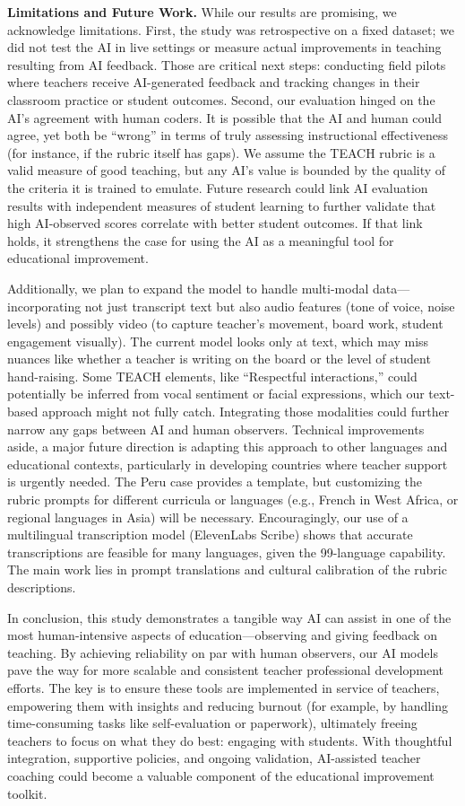 \documentclass[12pt]{article}
\begin{document}
\textbf{Limitations and Future Work.} While our results are promising, we acknowledge limitations. First, the study was retrospective on a fixed dataset; we did not test the AI in live settings or measure actual improvements in teaching resulting from AI feedback. Those are critical next steps: conducting field pilots where teachers receive AI-generated feedback and tracking changes in their classroom practice or student outcomes. Second, our evaluation hinged on the AI’s agreement with human coders. It is possible that the AI and human could agree, yet both be “wrong” in terms of truly assessing instructional effectiveness (for instance, if the rubric itself has gaps). We assume the TEACH rubric is a valid measure of good teaching, but any AI’s value is bounded by the quality of the criteria it is trained to emulate. Future research could link AI evaluation results with independent measures of student learning to further validate that high AI-observed scores correlate with better student outcomes. If that link holds, it strengthens the case for using the AI as a meaningful tool for educational improvement.

Additionally, we plan to expand the model to handle multi-modal data—incorporating not just transcript text but also audio features (tone of voice, noise levels) and possibly video (to capture teacher’s movement, board work, student engagement visually). The current model looks only at text, which may miss nuances like whether a teacher is writing on the board or the level of student hand-raising. Some TEACH elements, like “Respectful interactions,” could potentially be inferred from vocal sentiment or facial expressions, which our text-based approach might not fully catch. Integrating those modalities could further narrow any gaps between AI and human observers. Technical improvements aside, a major future direction is adapting this approach to other languages and educational contexts, particularly in developing countries where teacher support is urgently needed. The Peru case provides a template, but customizing the rubric prompts for different curricula or languages (e.g., French in West Africa, or regional languages in Asia) will be necessary. Encouragingly, our use of a multilingual transcription model (ElevenLabs Scribe) shows that accurate transcriptions are feasible for many languages, given the 99-language capability. The main work lies in prompt translations and cultural calibration of the rubric descriptions.

In conclusion, this study demonstrates a tangible way AI can assist in one of the most human-intensive aspects of education—observing and giving feedback on teaching. By achieving reliability on par with human observers, our AI models pave the way for more scalable and consistent teacher professional development efforts. The key is to ensure these tools are implemented in service of teachers, empowering them with insights and reducing burnout (for example, by handling time-consuming tasks like self-evaluation or paperwork), ultimately freeing teachers to focus on what they do best: engaging with students. With thoughtful integration, supportive policies, and ongoing validation, AI-assisted teacher coaching could become a valuable component of the educational improvement toolkit.
\end{document}
